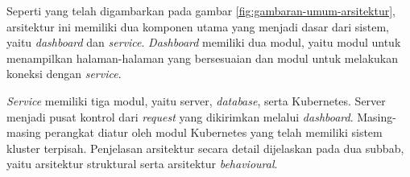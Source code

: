 Seperti yang telah digambarkan pada gambar \ref{fig:gambaran-umum-arsitektur}, arsitektur ini memiliki dua komponen utama yang menjadi dasar dari sistem, yaitu \textit{dashboard} dan \textit{service}. \textit{Dashboard} memiliki dua modul, yaitu modul untuk menampilkan halaman-halaman yang bersesuaian dan modul untuk melakukan koneksi dengan \textit{service}.

\textit{Service} memiliki tiga modul, yaitu server, \textit{database}, serta Kubernetes. Server menjadi pusat kontrol dari \textit{request} yang dikirimkan melalui \textit{dashboard}. Masing-masing perangkat diatur oleh modul Kubernetes yang telah memiliki sistem kluster terpisah. Penjelasan arsitektur secara detail dijelaskan pada dua subbab, yaitu arsitektur struktural serta arsitektur \textit{behavioural}.



